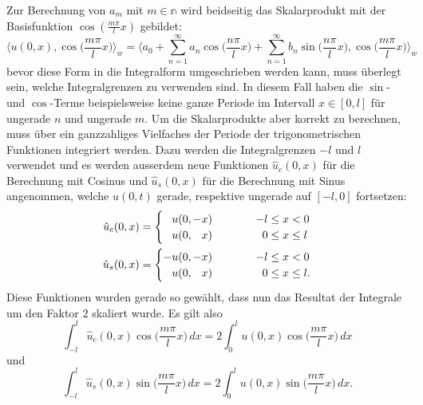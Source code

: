 Zur Berechnung von $a_m$ mit $ m \in \mathbb{n} $ wird beidseitig das
Skalarprodukt mit der Basisfunktion $ \cos(\frac{m \pi}{l}x)$
gebildet:
\begin{equation}
    \label{sturmliouville:eq:dot-product-cosine}
    \biggl\langle u(0, x), \cos\biggl(\frac{m \pi}{l}x\biggr) \biggr\rangle _w
    =
    \biggl\langle a_0
    +
    \sum_{n = 1}^{\infty} a_n\cos\biggl(\frac{n\pi}{l}x\biggr)
    +
    \sum_{n = 1}^{\infty} b_n\sin\biggl(\frac{n\pi}{l}x\biggr),
    \cos\biggl(\frac{m \pi}{l}x\biggr)\biggr\rangle _w
\end{equation}
bevor diese Form in die Integralform umgeschrieben werden kann, muss überlegt
sein, welche Integralgrenzen zu verwenden sind.
In diesem Fall haben die $\sin$- und $\cos$-Terme beispielsweise keine ganze
Periode im Intervall $x \in [0, l]$ für ungerade $n$ und ungerade $m$.
Um die Skalarprodukte aber korrekt zu berechnen, muss über ein ganzzahliges
Vielfaches der Periode der trigonometrischen Funktionen integriert werden.
Dazu werden die Integralgrenzen $-l$ und $l$ verwendet und es werden ausserdem
neue Funktionen $\hat{u}_c(0, x)$ für die Berechnung mit Cosinus und
$\hat{u}_s(0, x)$ für die Berechnung mit Sinus angenommen, welche $u(0, t)$
gerade, respektive ungerade auf $[-l, 0]$ fortsetzen:
\[
\begin{aligned}
    \hat{u}_c(0, x)
    &=
    \begin{cases}
        \phantom{-}u(0, -x) \qquad\qquad &\llap{$-l$}\leq x < 0
        \\
        \phantom{-}u(0, \phantom{-}x) \qquad\qquad &\llap{$0$}\leq x \leq l
    \end{cases}
    \\
    \hat{u}_s(0, x)
    &=
    \begin{cases}
        -u(0, -x) \qquad\qquad&\llap{$-l$}\leq x < 0
        \\
        \phantom{-}u(0, \phantom{-}x) \qquad\qquad&\llap{$0$}\leq x \leq l.
    \end{cases}
\end{aligned}
\]
Diese Funktionen wurden gerade so gewählt, dass nun das Resultat der Integrale
um den Faktor $2$ skaliert wurde.
Es gilt also
\[
    \int_{-l}^{l}\hat{u}_c(0, x)\cos\biggl(\frac{m \pi}{l}x\biggr)\,dx
    =
    2\int_{0}^{l}u(0, x)\cos\biggl(\frac{m \pi}{l}x\biggr)\,dx
\]
und
\[
    \int_{-l}^{l}\hat{u}_s(0, x)\sin\biggl(\frac{m \pi}{l}x\biggr)\,dx
    =
    2\int_{0}^{l}u(0, x)\sin\biggl(\frac{m \pi}{l}x\biggr)\,dx.
\]

